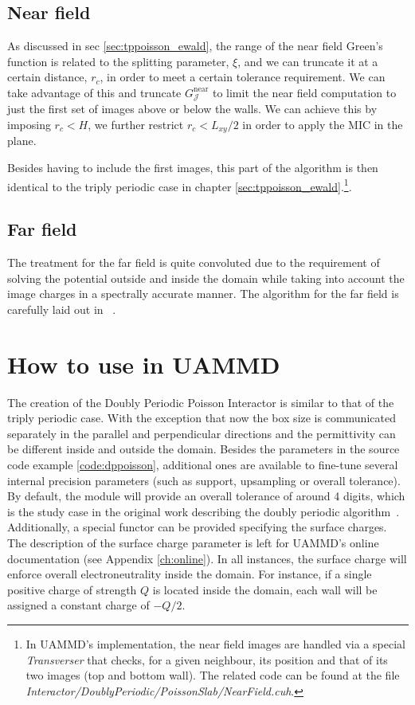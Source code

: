 \documentclass[twoside,openright,titlepage,numbers=noenddot,%
headinclude,footinclude,cleardoublepage=empty,abstract=on,
BCOR=5mm,fontsize=11pt, dvipsnames, paper=b5
]{scrreprt}
\newcommand{\oper}[1]{\mathcal{#1}}
\newcommand{\uammd}{\gls{UAMMD}\xspace}
\newcommand{\near}{\textrm{near}}
\begin{document}
\subsection{Near field}
As discussed in sec \ref{sec:tppoisson_ewald}, the range of the near field Green's function is related to the splitting parameter, $\xi$, and we can truncate it at a certain distance, $r_{c}$, in order to meet a certain tolerance requirement. We can take advantage of this and truncate $G_{\oper{J}}^{\near}$ to limit the near field computation to just the first set of images above or below the walls. We can achieve this by imposing $r_c<H$, we further restrict $r_c < L_{xy}/2$ in order to apply the \gls{MIC} in the plane.

Besides having to include the first images, this part of the algorithm is then identical to the triply periodic case in chapter \ref{sec:tppoisson_ewald}.\footnote{In \uammd's implementation, the near field images are handled via a special \emph{Transverser} that checks, for a given neighbour, its position and that of its two images (top and bottom wall). The related code can be found at the file \emph{Interactor/DoublyPeriodic/PoissonSlab/NearField.cuh}.}.
\subsection{Far field}

The treatment for the far field is quite convoluted due to the requirement of solving the potential outside and inside the domain while taking into account the image charges in a spectrally accurate manner. The algorithm for the far field is carefully laid out in ~\cite{Maxian2021}.

\section{How to use in UAMMD}
The creation of the Doubly Periodic Poisson Interactor is similar to that of the triply periodic case. With the exception that now the box size is communicated separately in the parallel and perpendicular directions and the permittivity can be different inside and outside the domain. Besides the parameters in the source code example \ref{code:dppoisson}, additional ones are available to fine-tune several internal precision parameters (such as support, upsampling or overall tolerance). By default, the module will provide an overall tolerance of around 4 digits, which is the study case in the original work describing the doubly periodic algorithm~\cite{Maxian2021}. Additionally, a special functor can be provided specifying the surface charges. The description of the surface charge parameter is left for UAMMD's online documentation (see Appendix \ref{ch:online}).
In all instances, the surface charge will enforce overall electroneutrality inside the domain. For instance, if a single positive charge of strength $Q$ is located inside the domain, each wall will be assigned a constant charge of $-Q/2$.
\end{document}
